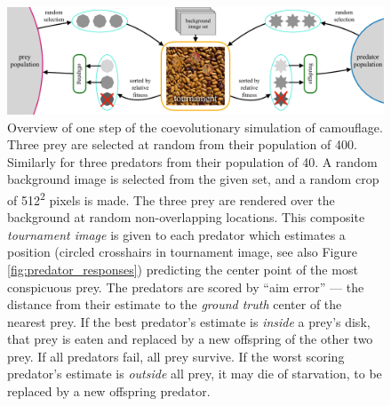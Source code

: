 \documentclass[letterpaper]{article}
\newcommand{\jargon}[1]{\textit{#1}}
\begin{document}

\begin{figure}[t]
    \includegraphics[width=\textwidth]{coc_overview.pdf}
    \caption{Overview of one step of the coevolutionary simulation of camouflage. Three prey are selected at random from their population of 400. Similarly for three predators from their population of 40. A random background image is selected from the given set, and a random crop of 512\textsuperscript{2} pixels is made. The three prey are rendered over the background at random non-overlapping locations. This composite \jargon{tournament image} is given to each predator which estimates a position (circled crosshairs in tournament image, see also Figure \ref{fig:predator_responses}) predicting the center point of the most conspicuous prey. The predators are scored by “aim error” --- the distance from their estimate to the \jargon{ground truth} center of the nearest prey. If the best predator's estimate is \textit{inside} a prey's disk, that prey is eaten and replaced by a new offspring of the other two prey. If all predators fail, all prey survive. If the worst scoring predator's estimate is \textit{outside} all prey, it may die of starvation, to be replaced by a new offspring predator.}
    \label{fig:simulation_overview}
\end{figure}

\end{document}
